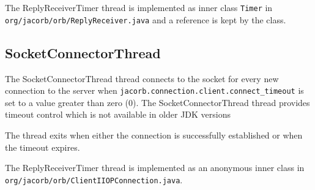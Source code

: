 The ReplyReceiverTimer thread is implemented as inner class {\tt Timer} in
{\tt org/jacorb/orb/ReplyReceiver.java} and a reference is kept by the class.

\subsection*{SocketConnectorThread}
The SocketConnectorThread thread connects to the socket for every new
connection to the server when {\tt jacorb.connection.client.connect\_timeout}
is set to a value greater than zero (0). The SocketConnectorThread thread
provides timeout control which is not available in older JDK versions

The thread exits when either the connection is successfully established or
when the timeout expires.

The ReplyReceiverTimer thread is implemented as an anonymous inner class in
{\tt org/jacorb/orb/ClientIIOP\-Connection.java}.
